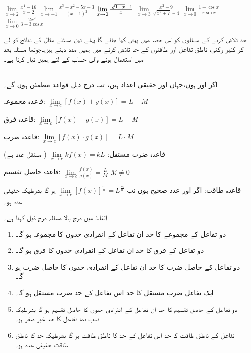 $\lim\limits_{x\to 2} \tfrac{x^4-16}{x-2}$
$\lim\limits_{x\to -1} \tfrac{x^3-x^2-5x-3}{(x+1)^2}$
$\lim\limits_{x\to 0} \tfrac{\sqrt[\leftroot{-2}3]{1+x}-1}{x}$
$\lim\limits_{x\to 3} \tfrac{x^2-9}{\sqrt{x^2+7}-4}$
$\lim\limits_{x\to 0} \tfrac{1-\cos x}{x\sin x}$
$\lim\limits_{x\to 0} \tfrac{2x^2}{3-3\cos x}$

حد تلاش کرنے کے مسئلوں کو اس حصہ میں پیش کیا جائے گا۔پہلے تین مسئلے مثال  کے نتائج کو لے کر کثیر رکنی، ناطق تفاعل اور طاقتوں  کے حد تلاش کرنے میں ہمیں مدد دیتے ہیں۔چوتھا مسئلہ بعد میں استعمال ہونے والی حساب کے لئے ہمیں تیار کرتا ہے۔


\\
اگر  اور  ہوں،جہاں  اور  حقیقی اعداد ہیں،  تب درج ذیل قواعد مطمئن ہوں گے۔
\begin{description}
\item{قاعدہ مجموعہ:}\quad 
$\lim\limits_{x\to c}[f(x)+g(x)]=L+M$
\item{قاعدہ فرق:}\quad
$\lim\limits_{x\to c}[f(x)-g(x)]=L-M$
\item{قاعدہ ضرب:}\quad
$\lim\limits_{x\to c}[f(x)\cdot g(x)]=L\cdot M$
\item{قاعدہ ضرب مستقل:}\quad
$\lim\limits_{x\to c} k f(x)=kL$
\quad
( مستقل عدد ہے)
\item{قاعدہ حاصل تقسیم:}\quad
$\lim\limits_{x\to c}\tfrac{f(x)}{g(x)}=\tfrac{L}{M}$
\quad
$M\ne 0$
\item{قاعدہ طاقت:}\quad
اگر  اور  عدد صحیح ہوں تب
$\lim\limits_{x\to c}[f(x)]^{\tfrac{m}{n}}=L^{\tfrac{m}{n}}$
 ہو گا بشرطیکہ   حقیقی عدد ہو۔
\end{description}

الفاظ میں درج بالا مسئلہ درج ذیل کہتا ہے۔
\begin{enumerate}
\item
دو تفاعل کے مجموعے کا حد ان تفاعل کے انفرادی حدوں کا مجموعہ ہو گا۔
\item
دو تفاعل کے فرق  کا حد ان تفاعل کے انفرادی حدوں کا فرق ہو گا۔
\item
دو تفاعل کے حاصل ضرب  کا حد ان تفاعل کے انفرادی حدوں کا حاصل ضرب  ہو گا۔
\item
ایک تفاعل ضرب مستقل کا حد اس تفاعل کے حد ضرب مستقل ہو گا۔
\item
دو تفاعل کے حاصل تقسیم کا حد ان تفاعل کے انفرادی حدوں کا حاصل تقسیم ہو گا بشرطیکہ نسب نما تفاعل کا حد غیر صفر ہو۔
\item
تفاعل کے ناطق طاقت کا حد اس تفاعل کے حد کا ناطق طاقت ہو گا بشرطیکہ حد کا ناطق طاقت  حقیقی عدد ہو۔ 
\end{enumerate}

